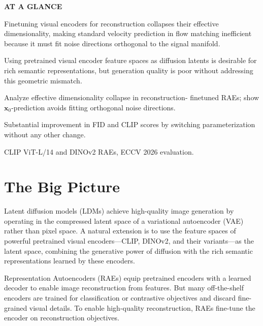 \documentclass[10pt,twocolumn]{article}
\begin{document}
\begin{mdframed}[backgroundcolor=boxgray,linecolor=rulered,linewidth=1pt,
    innerleftmargin=6pt,innerrightmargin=6pt,
    innertopmargin=6pt,innerbottommargin=6pt]
\textbf{\small AT A GLANCE}\par\vspace{4pt}
\begin{description}[leftmargin=0pt,labelsep=4pt,itemsep=2pt,parsep=0pt,
    font=\small\bfseries]
  \item[Problem:] Finetuning visual encoders for reconstruction collapses
    their effective dimensionality, making standard velocity prediction in
    flow matching inefficient because it must fit noise directions orthogonal
    to the signal manifold.
  \item[Why it matters:] Using pretrained visual encoder feature spaces as
    diffusion latents is desirable for rich semantic representations, but
    generation quality is poor without addressing this geometric mismatch.
  \item[Method:] Analyze effective dimensionality collapse in reconstruction-
    finetuned RAEs; show $\mathbf{x}_0$-prediction avoids fitting orthogonal
    noise directions.
  \item[Result:] Substantial improvement in FID and CLIP scores by switching
    parameterization without any other change.
  \item[Evidence:] CLIP ViT-L/14 and DINOv2 RAEs, ECCV 2026 evaluation.
\end{description}
\end{mdframed}

\section{The Big Picture}

Latent diffusion models (LDMs) achieve high-quality image generation by
operating in the compressed latent space of a variational autoencoder (VAE)
rather than pixel space. A natural extension is to use the feature spaces of
powerful pretrained visual encoders---CLIP, DINOv2, and their variants---as
the latent space, combining the generative power of diffusion with the rich
semantic representations learned by these encoders.

Representation Autoencoders (RAEs) equip pretrained encoders with a learned
decoder to enable image reconstruction from features. But many off-the-shelf
encoders are trained for classification or contrastive objectives and discard
fine-grained visual details. To enable high-quality reconstruction, RAEs
fine-tune the encoder on reconstruction objectives.
\end{document}

